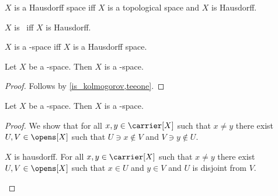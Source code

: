 \begin{abbreviation}\label{hausdorff_space}
    $X$ is a Hausdorff space iff $X$ is a topological space and
    $X$ is Hausdorff.
\end{abbreviation}

\begin{abbreviation}\label{teetwo}
    $X$ is \teetwo\ iff $X$ is Hausdorff.
\end{abbreviation}

\begin{abbreviation}\label{teetwo_space}
    $X$ is a \teetwo-space iff $X$ is a Hausdorff space.
\end{abbreviation}

\begin{proposition}\label{teeone_space_is_teezero_space}
    Let $X$ be a \teeone-space.
    Then $X$ is a \teezero-space.
\end{proposition}
\begin{proof}
    Follows by \cref{is_kolmogorov,teeone}.
\end{proof}

\begin{proposition}\label{teetwo_space_is_teeone_space}
    Let $X$ be a \teetwo-space.
    Then $X$ is a \teeone-space.
\end{proposition}
\begin{proof}
    We show that for all $x,y\in\carrier[X]$ such that $x\neq y$
    there exist $U, V\in\opens[X]$ such that
    $U\ni x\notin V$ and $V\ni y\notin U$.
    \begin{subproof}
        $X$ is hausdorff.
        For all $x,y\in\carrier[X]$ such that $x\neq y$
        there exist $U, V\in\opens[X]$ such that
        $x\in U$ and $y\in V$ and $U$ is disjoint from $V$.
    \end{subproof}
\end{proof}

